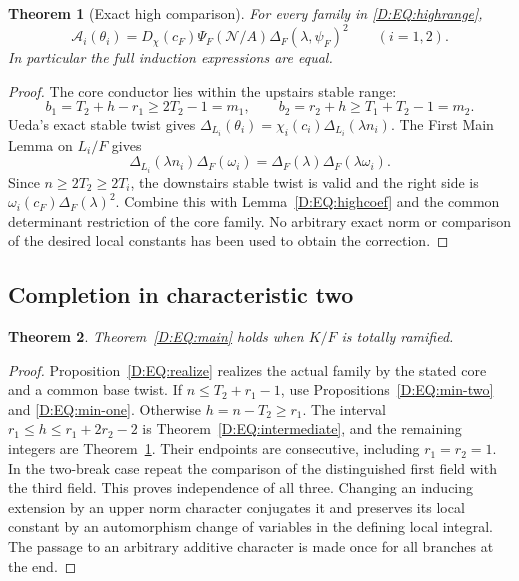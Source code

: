 \documentclass[11pt]{amsart}
\newtheorem{theorem}{Theorem}[section]
\theoremstyle{definition}
\theoremstyle{remark}
\begin{document}
\begin{theorem}[Exact high comparison]\label{D:EQ:highcomparison}
For every family in \eqref{D:EQ:highrange},
\begin{equation}\label{D:EQ:highanswer}
 \mathcal A_i(\theta_i)
   =D_\chi(c_F)\Psi_F(\mathcal N/A)\Delta_F(\lambda,\psi_F)^2
                    \qquad(i=1,2).
\end{equation}
In particular the full induction expressions are equal.
\end{theorem}
\begin{proof}
The core conductor lies within the upstairs stable range:
\[
 b_1=T_2+h-r_1\ge 2T_2-1=m_1,\qquad
 b_2=r_2+h\ge T_1+T_2-1=m_2.
\]
Ueda's exact stable twist gives
$\Delta_{L_i}(\theta_i)=\chi_i(c_i)\Delta_{L_i}(\lambda n_i)$.
The First Main Lemma on $L_i/F$ gives
\[
 \Delta_{L_i}(\lambda n_i)\Delta_F(\omega_i)
                =\Delta_F(\lambda)\Delta_F(\lambda\omega_i).
\]
Since $n\ge2T_2\ge2T_i$, the downstairs stable twist is valid and
the right side is $\omega_i(c_F)\Delta_F(\lambda)^2$.
Combine this with Lemma~\ref{D:EQ:highcoef} and the common determinant
restriction of the core family. No arbitrary exact norm or comparison
of the desired local constants has been used to obtain the correction.
\end{proof}

\subsection{Completion in characteristic two}
\begin{theorem}\label{D:EQ:total-complete}
Theorem~\ref{D:EQ:main} holds when $K/F$ is totally ramified.
\end{theorem}
\begin{proof}
Proposition~\ref{D:EQ:realize} realizes the actual family by the stated core
and a common base twist. If $n\le T_2+r_1-1$, use
Propositions~\ref{D:EQ:min-two} and \ref{D:EQ:min-one}.
Otherwise $h=n-T_2\ge r_1$. The interval
$r_1\le h\le r_1+2r_2-2$ is Theorem~\ref{D:EQ:intermediate}, and the
remaining integers are Theorem~\ref{D:EQ:highcomparison}.
Their endpoints are consecutive, including $r_1=r_2=1$.
In the two-break case repeat the comparison of the distinguished first
field with the third field. This proves independence of all three.
Changing an inducing extension by an upper norm character conjugates it
and preserves its local constant by an automorphism change of variables
in the defining local integral. The passage to an arbitrary additive
character is made once for all branches at the end.
\end{proof}
\end{document}
